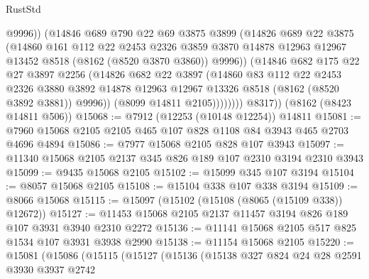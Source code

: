 \begin{lexlean}{RustStd}
\begin{coremodule}
                      @9996))
                  (@14846
                    @689
                    @790
                    @22
                    @69
                    @3875
                    @3899
                    (@14826
                      @689
                      @22
                      @3875
                      (@14860
                        @161
                        @112
                        @22
                        @2453
                        @2326
                        @3859
                        @3870
                        @14878
                        @12963
                        @12967
                        @13452
                        @8518
                        (@8162 (@8520 @3870 @3860))
                        @9996))
                    (@14846
                      @682
                      @175
                      @22
                      @27
                      @3897
                      @2256
                      (@14826
                        @682
                        @22
                        @3897
                        (@14860
                          @83
                          @112
                          @22
                          @2453
                          @2326
                          @3880
                          @3892
                          @14878
                          @12963
                          @12967
                          @13326
                          @8518
                          (@8162 (@8520 @3892 @3881))
                          @9996))
                      (@8099 @14811 @2105))))))))
        @8317))
    (@8162 (@8423 @14811 @506))
@15068 := @7912 (@12253 (@10148 @12254)) @14811
@15081 := @7960 @15068 @2105 @2105 @465 @107 @828 @1108 @84 @3943 @465 @2703 @4696 @4894
@15086 := @7977 @15068 @2105 @828 @107 @3943
@15097 := @11340 @15068 @2105 @2137 @345 @826 @189 @107 @2310 @3194 @2310 @3943
@15099 := @9435 @15068 @2105
@15102 := @15099 @345 @107 @3194
@15104 := @8057 @15068 @2105
@15108 := @15104 @338 @107 @338 @3194
@15109 := @8066 @15068
@15115 := @15097 (@15102 (@15108 (@8065 (@15109 @338)) @12672))
@15127 := @11453 @15068 @2105 @2137 @11457 @3194 @826 @189 @107 @3931 @3940 @2310 @2272
@15136 := @11141 @15068 @2105 @517 @825 @1534 @107 @3931 @3938 @2990
@15138 := @11154 @15068 @2105
@15220 := @15081
    (@15086
      (@15115
        (@15127
          (@15136
            (@15138
              @327
              @824
              @24
              @28
              @2591
              @3930
              @3937
              @2742

\end{coremodule}
\end{lexlean}
